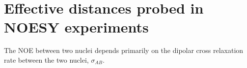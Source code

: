 \documentclass[9pt,review]{livecoms}
\newcommand{\githubrepository}{\url{https://github.com/openforcefield/review-protein-benchmark-datasets}}  %
\begin{document}

%










\appendix
\section{Effective distances probed in NOESY experiments}
\label{app:noesy_distances}

The NOE between two nuclei depends primarily on the dipolar cross relaxation rate between the two nuclei, $\sigma_{AB}$.
\end{document}
